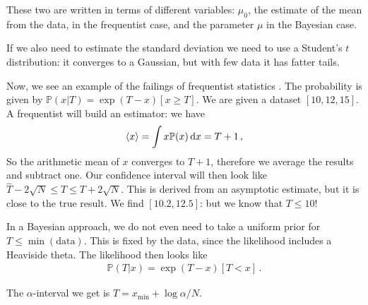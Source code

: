 \documentclass[main.tex]{subfiles}
\begin{document}
These two are written in terms of different variables: \(\mu_0\), the estimate of the mean from the data, in the frequentist case, and the parameter \(\mu \) in the Bayesian case. 

If we also need to estimate the standard deviation we need to use a Student's \(t\) distribution: it converges to a Gaussian, but with few data it has fatter tails.

Now, we see an example of the failings of frequentist statistics \cite[]{vanderplasFrequentismBayesianismIII2014}.
The probability is given by \(\mathbb{P}(x | T) = \exp(T - x) [x \geq T]\). We are given a dataset \([10, 12,  15]\). 
A frequentist will build an estimator: we have
%
\begin{align}
\expval{x} = \int x \mathbb{P}(x) \dd{x}  = T +1
\,,
\end{align}
%
So the arithmetic mean of \(x\) converges to \(T +1\), therefore we average the results and subtract one. 
Our confidence interval will then look like \(\hat{T} -2 \sqrt{N} \leq T \leq T + 2 \sqrt{N}\). 
This is derived from an asymptotic estimate, but it is close to the true result.
We find \([\num{10.2}, \num{12.5}]\): but we know that \(T \leq 10\)! 

In a Bayesian approach, we do not even need to take a uniform prior for \(T \leq \min (\text{data})\). This is fixed by the data, since the likelihood includes a Heaviside theta. 
The likelihood then looks like 
%
\begin{align}
\mathbb{P}(T | x) = \exp(T - x) [T < x]
\,.
\end{align}

The \(\alpha \)-interval we get is \(T = x _{\text{min}} + \log \alpha  / N\). 
\end{document}
